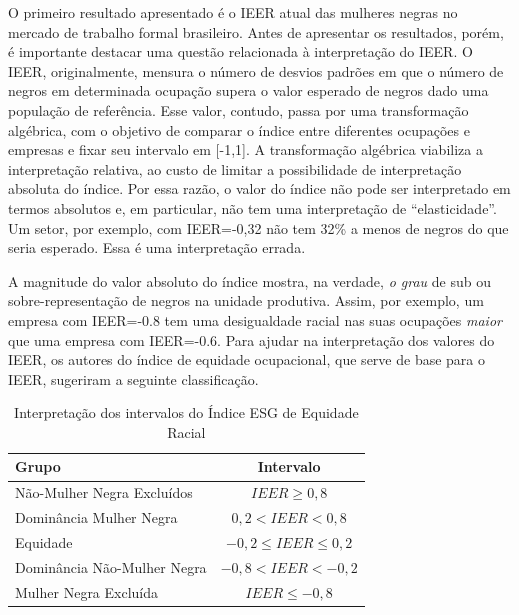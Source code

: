 \documentclass[12pt]{article}
\begin{document}
\par O primeiro resultado apresentado é o IEER atual das mulheres negras no mercado de trabalho formal brasileiro. Antes de apresentar os resultados, porém, é importante destacar uma questão relacionada à interpretação do IEER. O IEER, originalmente, mensura o número de desvios padrões em que o número de negros em determinada ocupação supera o valor esperado de negros dado uma população de referência. Esse valor, contudo, passa por uma transformação algébrica, com o objetivo de comparar o índice entre diferentes ocupações e empresas e fixar seu intervalo em [-1,1]. A transformação algébrica viabiliza a interpretação relativa, ao custo de limitar a possibilidade de interpretação absoluta do índice. Por essa razão, o valor do índice não pode ser interpretado em termos absolutos e, em particular, não tem uma interpretação de \enquote{elasticidade}. Um setor, por exemplo, com IEER=-0,32 não tem 32\% a menos de negros do que seria esperado. Essa é uma interpretação errada.

\par A magnitude do valor absoluto do índice mostra, na verdade, \textit{o grau} de sub ou sobre-representação de negros na unidade produtiva. Assim, por exemplo, um empresa com IEER=-0.8 tem uma desigualdade racial nas suas ocupações \textit{maior} que uma empresa com IEER=-0.6. Para ajudar na interpretação dos valores do IEER, os autores do índice de equidade ocupacional, que serve de base para o IEER, sugeriram a seguinte classificação.\autocite{ransom2001one}

\begin{table}[htb!]
\centering
\caption{Interpretação dos intervalos do Índice ESG de Equidade Racial}
\begin{tabular}{lc}
\hline
Grupo             & Intervalo                 \\ \hline
Não-Mulher Negra Excluídos & $IEER \geq 0, 8 $               \\
Dominância Mulher Negra  & $0,2 < IEER < 0,8$   \\
Equidade          & $-0,2\leq IEER \leq 0,2$  \\
Dominância Não-Mulher Negra & $-0,8 < IEER < -0,2$ \\
Mulher Negra Excluída  & $IEER \leq -0,8$        \\ \hline
\end{tabular}
\end{table}
\end{document}
